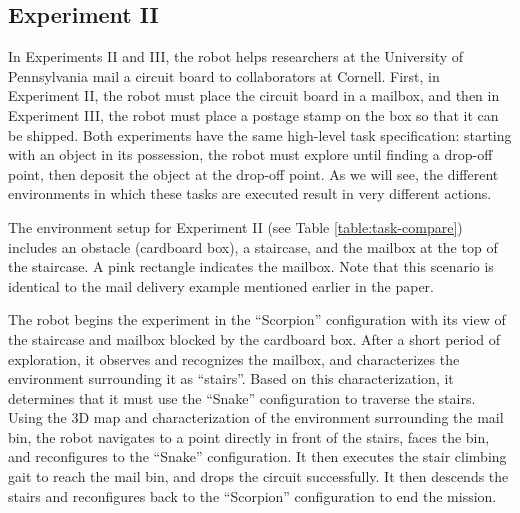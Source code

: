 \documentclass[journal]{IEEEtran}
\begin{document}
\subsection{Experiment II}
%
In Experiments II and III, the robot helps researchers at the University of Pennsylvania mail a circuit board to collaborators at Cornell.  First, in Experiment II, the robot must place the circuit board in a mailbox, and then in Experiment III, the robot must place a postage stamp on the box so that it can be shipped.  Both experiments have the same high-level task specification: starting with an object in its possession, the robot must explore until finding a drop-off point, then deposit the object at the drop-off point.  As we will see, the different environments in which these tasks are executed result in very different actions.



The environment setup for Experiment II (see Table \ref{table:task-compare}) includes an obstacle (cardboard box), a staircase, and the mailbox at the top of the staircase.  A pink rectangle indicates the mailbox.  Note that this scenario is identical to the mail delivery example mentioned earlier in the paper.  

The robot begins the experiment in the ``Scorpion'' configuration with its view of the staircase and mailbox blocked by the cardboard box.  After a short period of exploration, it observes and recognizes the mailbox, and characterizes the environment surrounding it as ``stairs''. Based on this characterization, it determines that it must use the ``Snake'' configuration to traverse the stairs. Using the 3D map and characterization of the environment surrounding the mail bin, the robot navigates to a point directly in front of the stairs, faces the bin, and reconfigures to the ``Snake'' configuration. It then executes the stair climbing gait to reach the mail bin, and drops the circuit successfully. It then descends the stairs and reconfigures back to the ``Scorpion'' configuration to end the mission.
\end{document}
